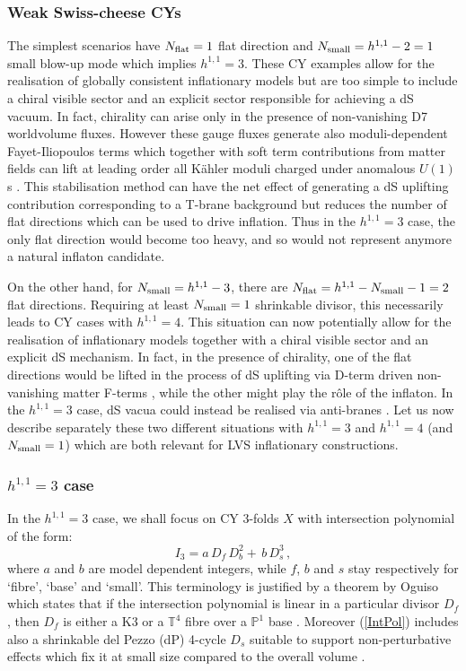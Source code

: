 \documentclass[11pt,a4paper]{article}
\newcommand{\be}{\begin{equation}}
\newcommand{\ee}{\end{equation}}
\def\T{{\mathbb T}}
\def\P{{\mathbb P}}
\begin{document}
\subsubsection{Weak Swiss-cheese CYs}

The simplest scenarios have $N_{\rm flat}=1$ flat direction and $N_{\rm small}=h^{1,1}-2=1$ small blow-up mode which implies $h^{1,1}=3$. These CY examples allow for the realisation of globally consistent inflationary models but are too simple to include a chiral visible sector and an explicit sector responsible for achieving a dS vacuum. In fact, chirality can arise only in the presence of non-vanishing D7 worldvolume fluxes. However these gauge fluxes generate also moduli-dependent Fayet-Iliopoulos terms which together with soft term contributions from matter fields can lift at leading order all K\"ahler moduli charged under anomalous $U(1)$s \cite{Cicoli:2012fh}. This stabilisation method can have the net effect of generating a dS uplifting contribution \cite{CYembedding} corresponding to a T-brane background \cite{Cicoli:2015ylx} but reduces the number of flat directions which can be used to drive inflation. Thus in the $h^{1,1}=3$ case, the only flat direction would become too heavy, and so would not represent anymore a natural inflaton candidate. 

On the other hand, for $N_{\rm small}=h^{1,1}-3$, there are $N_{\rm flat} = h^{1,1}-N_{\rm small}-1=2$ flat directions. Requiring at least $N_{\rm small}=1$ shrinkable divisor, this necessarily leads to CY cases with $h^{1,1}=4$. This situation can now potentially allow for the realisation of inflationary models together with a chiral visible sector and an explicit dS mechanism. In fact, in the presence of chirality, one of the flat directions would be lifted in the process of dS uplifting via D-term driven non-vanishing matter F-terms \cite{CYembedding, Cicoli:2015ylx}, while the other might play the r\^ole of the inflaton. In the $h^{1,1}=3$ case, dS vacua could instead be realised via anti-branes \cite{Kachru:2003aw}. Let us now describe separately these two different situations with $h^{1,1}=3$ and $h^{1,1}=4$ (and $N_{\rm small}=1$) which are both relevant for LVS inflationary constructions.

\subsubsection*{$h^{1,1}=3$ case}

In the $h^{1,1}=3$ case, we shall focus on CY 3-folds $X$ with intersection polynomial of the form:
\be
I_3 = a\, D_f\, D_b^2+\, b\, D_s^3\,,
\label{IntPol}
\ee
where $a$ and $b$ are model dependent integers, while $f$, $b$ and $s$ stay respectively for `fibre', `base' and `small'. This terminology is justified by a theorem by Oguiso which states that if the intersection polynomial is linear in a particular divisor $D_f$, then $D_f$ is either a K3 or a $\T^4$ fibre over a $\P^1$ base \cite{Math}. Moreover (\ref{IntPol}) includes also a shrinkable del Pezzo (dP) 4-cycle $D_s$ suitable to support non-perturbative effects which fix it at small size compared to the overall volume \cite{Cicoli:2008va}. 
\end{document}
